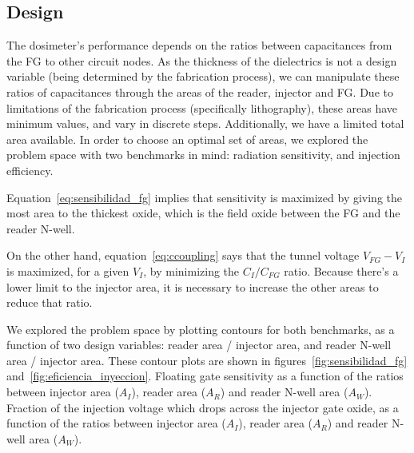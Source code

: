 {\subsection{Design}
The dosimeter's performance depends on the ratios between 
capacitances from the FG to other circuit nodes.
As the thickness of the dielectrics is not a design variable
(being determined by the fabrication process),
we can manipulate these ratios of capacitances through the
areas of the reader, injector and FG.
Due to limitations of the fabrication process (specifically lithography),
these areas have minimum values, and vary in discrete steps.
Additionally, we have a limited total area available.
In order to choose an optimal set of areas,
we explored the problem space with two benchmarks in mind:
radiation sensitivity, and injection efficiency.

Equation~\ref{eq:sensibilidad_fg} implies that sensitivity is maximized
by giving the most area to the thickest oxide,
which is the field oxide between the FG and the reader N-well.

On the other hand, equation~\ref{eq:ccoupling}
says that the tunnel voltage $V_{FG}-V_I$
is maximized, for a given $V_I$,
by minimizing the $C_I/C_{FG}$ ratio.
Because there's a lower limit to the injector area,
it is necessary to increase the other areas to reduce that ratio.

We explored the problem space by plotting contours for both benchmarks,
as a function of two design variables:
reader area / injector area,
and reader N-well area / injector area.
These contour plots are shown in figures~\ref{fig:sensibilidad_fg}
and~\ref{fig:eficiencia_inyeccion}.
{Floating gate sensitivity 
as a function of the ratios between
injector area ($A_I$),
reader area ($A_R$) 
and reader N-well area ($A_W$).}
{Fraction of the injection voltage which drops across the injector gate oxide,
as a function of the ratios between
injector area ($A_I$),
reader area ($A_R$) 
and reader N-well area ($A_W$).}

}
